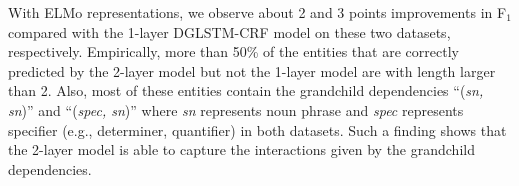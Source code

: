 With ELMo representations, we observe about 2 and 3 points improvements in F$_1$  compared with the 1-layer DGLSTM-CRF model on these two datasets, respectively. 
Empirically, more than 50\% of the entities that are correctly predicted by the 2-layer model but not the 1-layer model are with length larger than 2.
Also, most of these entities contain the grandchild dependencies ``(\textit{sn, sn})'' and ``(\textit{spec, sn})'' where \textit{sn} represents noun phrase and \textit{spec} represents specifier (e.g., determiner, quantifier) in both datasets. 
Such a finding shows that the 2-layer model is able to capture the interactions given by the grandchild dependencies. 
%






